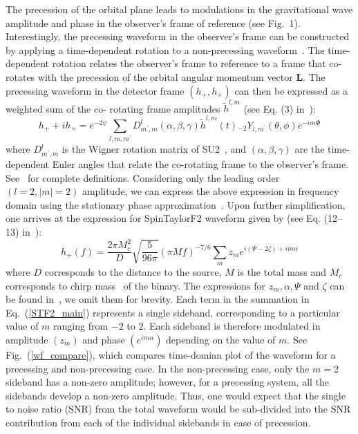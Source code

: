 The precession of the orbital plane leads to modulations in the gravitational
wave amplitude and phase in the observer's frame of reference (see Fig.~1).
Interestingly, the precessing waveform in the observer's frame can be constructed  by
applying a time-dependent rotation to a non-precessing
waveform~\cite{Boyle2011}. The time-dependent rotation relates the observer's
frame to  reference to a frame that co-rotates with the precession of the
orbital angular momentum vector $\mathbf{L}$. The precessing waveform in the detector
frame $(h_{+},h_{\times})$ can then be expressed as a weighted sum of the co-
rotating frame amplitudes $\tilde{h}^{l,m}$ (see Eq. (3)
in~\cite{Lundgren2014}): 
\begin{equation}  
h_{+} + i h_{\times} = e^{-2 \psi}
\sum_{l,m,m^{\prime}} D^{l}_{m^{\prime},m} \left(\alpha, \beta, \gamma\right)
\tilde{h}^{l,m}(t){}_{-2}Y_{l,m^{\prime}}\left(\theta,\phi\right)e^{-i m \Phi}
\end{equation}  
where $D^{l}_{m^{\prime},m}$ is the Wigner rotation matrix of
SU2~\cite{Boyle2011}, and $\left(\alpha, \beta, \gamma\right)$ are the time-
dependent  Euler angles that relate the co-rotating frame to the observer's
frame. See~\cite{Lundgren2014} for complete definitions. 
Considering only the leading order $(l=2, |m| = 2)$ amplitude, 
we can express the above expression in frequency domain
using the stationary phase approximation~\cite{Lundgren2014}. Upon further simplification,
one arrives at the expression for SpinTaylorF2 waveform given by (see Eq. (12--13)
in~\cite{Lundgren2014}):
\begin{equation} 
\label{STF2_main}
h_{+}(f) = \dfrac{2\pi M_{c}^{2}}{D}\sqrt{\dfrac{5}{96\pi}}(\pi M f)^{-7/6}\sum_{m}z_{m}e^{i(\Psi - 2\zeta) + i m \alpha}
\end{equation}
where $D$ corresponds to the distance to the source, $M$ is the total mass and $M_{c}$ 
corresponds to chirp mass~\cite{Lundgren2014} of the binary. The expressions for $z_{m}, \alpha, \Psi$ and $\zeta$ 
can be found in~\cite{Lundgren2014}, we omit them for brevity. Each term in the summation in Eq.~(\ref{STF2_main}) 
represents a single sideband, corresponding to a particular value of $m$ ranging from $-2$ to $2$. Each sideband is 
therefore modulated in amplitude $(z_{m})$ and phase $(e^{i m \alpha})$ depending on the value of $m$. See Fig.~(\ref{wf_compare}), which 
compares time-domian plot of the waveform for a precessing and non-precessing case. In the non-precessing case, 
only the $m=2$ sideband has a non-zero amplitude; however, for a precessing system, all the sidebands
develop a non-zero amplitude. Thus, one would expect that the single to noise ratio (SNR) from the total waveform would be sub-divided
into the SNR contribution from each of the individual sidebands in case of precession. 

